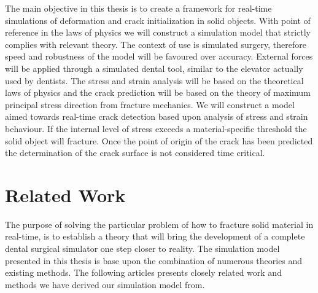 The main objective in this thesis is to create a framework for
real-time simulations of deformation and crack initialization in solid
objects. 
%
With point of reference in the laws of physics we will
construct a simulation model that strictly complies with relevant
theory. The context of use is simulated surgery, therefore speed
and robustness of the model will be favoured over accuracy.
%
External forces will be applied through a simulated dental tool, similar
to the elevator actually used by dentists. 
%
The stress and strain analysis will be based on 
the theoretical laws of physics and the crack prediction will be based on
the theory of maximum principal stress direction from fracture mechanics. 
%
We will construct a model aimed towards real-time crack detection
based upon analysis of stress and strain behaviour. If the
internal level of stress exceeds a material-specific threshold the
solid object will fracture. Once the point of origin of the crack has
been predicted the determination of the crack surface is not
considered time critical.







\section{Related Work}
The purpose of solving the particular problem of how to
fracture solid material in real-time, is to establish a theory 
that will bring the development of a complete dental surgical
simulator one step closer to reality. The simulation model presented
in this thesis is base upon the combination of numerous theories and
existing methods. 
%
The following articles presents closely related work and methods
we have derived our simulation model from. \\

